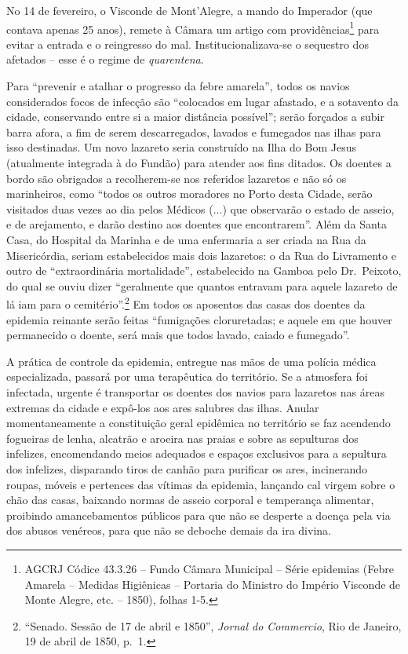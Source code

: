 No 14 de fevereiro, o Visconde de Mont'Alegre, a mando do Imperador (que
contava apenas 25 anos), remete à Câmara um artigo com
providências\footnote{AGCRJ Códice 43.3.26 -- Fundo Câmara Municipal --
  Série epidemias (Febre Amarela -- Medidas Higiênicas -- Portaria do
  Ministro do Império Visconde de Monte Alegre, etc. -- 1850), folhas
  1-5.} para evitar a entrada e o reingresso do mal.
Institucionalizava-se o sequestro dos afetados -- esse é o regime de
\emph{quarentena}.

Para ``prevenir e atalhar o progresso da febre amarela'', todos os
navios considerados focos de infecção são ``colocados em lugar afastado,
e a sotavento da cidade, conservando entre si a maior distância
possível''; serão forçados a subir barra afora, a fim de serem
descarregados, lavados e fumegados nas ilhas para isso destinadas. Um
novo lazareto seria construído na Ilha do Bom Jesus (atualmente
integrada à do Fundão) para atender aos fins ditados. Os doentes a bordo
são obrigados a recolherem-se nos referidos lazaretos e não só os
marinheiros, como ``todos os outros moradores no Porto desta Cidade,
serão visitados duas vezes ao dia pelos Médicos (...) que observarão o
estado de asseio, e de arejamento, e darão destino aos doentes que
encontrarem''. Além da Santa Casa, do Hospital da Marinha e de uma
enfermaria a ser criada na Rua da Misericórdia, seriam estabelecidos
mais dois lazaretos: o da Rua do Livramento e outro de ``extraordinária
mortalidade'', estabelecido na Gamboa pelo Dr.~Peixoto, do qual se ouviu
dizer ``geralmente que quantos entravam para aquele lazareto de lá iam
para o cemitério''.\footnote{``Senado. Sessão de 17 de abril e 1850'',
  \emph{Jornal do Commercio}, Rio de Janeiro, 19 de abril de 1850, p.~1.}
Em todos os aposentos das casas dos doentes da epidemia reinante serão
feitas ``fumigações cloruretadas; e aquele em que houver permanecido o
doente, será mais que todos lavado, caiado e fumegado''.

A prática de controle da epidemia, entregue nas mãos de uma polícia
médica especializada, passará por uma terapêutica do território. Se a
atmosfera foi infectada, urgente é transportar os doentes dos navios
para lazaretos nas áreas extremas da cidade e expô-los aos ares salubres
das ilhas. Anular momentaneamente a constituição geral epidêmica no
território se faz acendendo fogueiras de lenha, alcatrão e aroeira nas
praias e sobre as sepulturas dos infelizes, encomendando meios adequados
e espaços exclusivos para a sepultura dos infelizes, disparando tiros de
canhão para purificar os ares, incinerando roupas, móveis e pertences
das vítimas da epidemia, lançando cal virgem sobre o chão das casas,
baixando normas de asseio corporal e temperança alimentar, proibindo
amancebamentos públicos para que não se desperte a doença pela via dos
abusos venéreos, para que não se deboche demais da ira divina.

